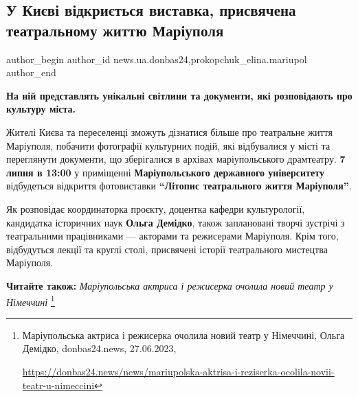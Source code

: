  
 
 
 
 
 
\subsection{У Києві відкриється виставка, присвячена театральному життю Маріуполя}
\label{sec:05_07_2023.stz.news.ua.donbas24.1.u_kyevi_vidkryetsja_vystavka_teatr_zhyttja_demidko}
 
\ifcmt
 author_begin
   author_id news.ua.donbas24,prokopchuk_elina.mariupol
 author_end
\fi


\textbf{На ній представлять унікальні світлини та документи, які розповідають про культуру міста.}

Жителі Києва та переселенці зможуть дізнатися більше про театральне життя
Маріуполя, побачити фотографії культурних подій, які відбувалися у місті та
переглянути документи, що зберігалися в архівах маріупольського драмтеатру. \textbf{7
липня в 13:00} у приміщенні \textbf{Маріупольського державного університету} відбудеться
відкриття фотовиставки \textbf{\enquote{Літопис театрального життя Маріуполя}}.

Як розповідає координаторка проєкту, доцентка кафедри культурології, кандидатка
історичних наук \textbf{Ольга Демідко}, також заплановані творчі зустрічі з театральними
працівниками — акторами та режисерами Маріуполя. Крім того, відбудуться лекції
та круглі столі, присвячені історії театрального мистецтва Маріуполя.

\textbf{Читайте також:} \emph{Маріупольська актриса і режисерка очолила новий театр у Німеччині}%
\footnote{Маріупольська актриса і режисерка очолила новий театр у Німеччині, Ольга Демідко, donbas24.news, 27.06.2023, \par%
\url{https://donbas24.news/news/mariupolska-aktrisa-i-reziserka-ocolila-novii-teatr-u-nimeccini}%
}

